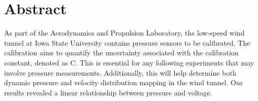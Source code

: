\thispagestyle{plain} %



\chapter*{Abstract} %
As part of the Aerodynamics and Propulsion Laboratory, the low-speed wind tunnel at Iowa State University contains pressure sensors to be calibrated. The calibration aims to quantify the uncertainty associated with the calibration constant, denoted as C. This is essential for any following experiments that may involve pressure measurements. Additionally, this will help determine both dynamic pressure and velocity distribution mapping in the wind tunnel. Our results revealed a linear relationship between pressure and voltage.



